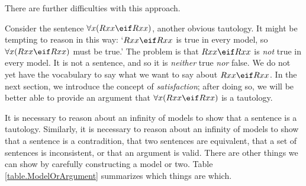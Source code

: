 

There are further difficulties with this approach.

Consider the sentence $\forall x(Rxx\eif Rxx)$, another obvious tautology. It might be tempting to reason in this way: `$Rxx\eif Rxx$ is true in every model, so $\forall x(Rxx\eif Rxx)$ must be true.' The problem is that $Rxx\eif Rxx$ is \emph{not} true in every model. It is not a sentence, and so it is \emph{neither} true \emph{nor} false. We do not yet have the vocabulary to say what we want to say about $Rxx\eif Rxx$. In the next section, we introduce the concept of \emph{satisfaction}; after doing so, we will be better able to provide an argument that $\forall x(Rxx\eif Rxx)$ is a tautology.

It is necessary to reason about an infinity of models to show that a sentence is a tautology. Similarly, it is necessary to reason about an infinity of models to show that a sentence is a contradition, that two sentences are equivalent, that a set of sentences is inconsistent, or that an argument is valid. There are other things we can show by carefully constructing a model or two. Table \ref{table.ModelOrArgument} summarizes which things are which.





